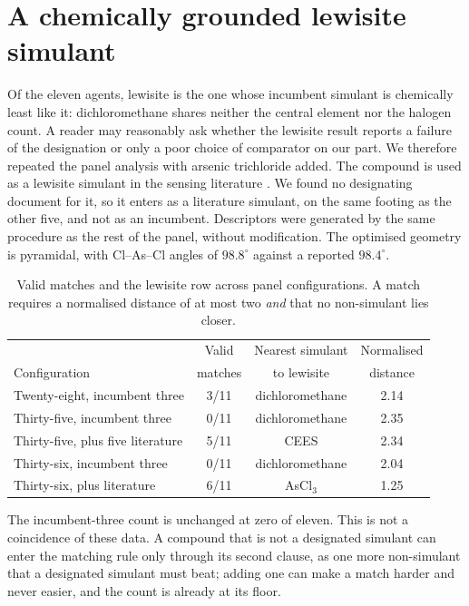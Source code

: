 \documentclass[11pt,a4paper]{article}
\begin{document}
\section{A chemically grounded lewisite simulant}
\label{sec:si-ascl3}

\begin{sloppypar}
Of the eleven agents, lewisite is the one whose incumbent simulant is
chemically least like it: dichloromethane shares neither the central element
nor the halogen count. A reader may reasonably ask whether the lewisite result
reports a failure of the designation or only a poor choice of comparator on
our part. We therefore repeated the panel analysis with arsenic trichloride
added. The compound is used as a lewisite simulant in the sensing
literature \cite{lee2016lewisite}. We found no designating document for it,
so it enters as a literature simulant, on the same footing as the other
five, and not as an incumbent. Descriptors were generated by the same procedure as the
rest of the panel, without modification. The optimised geometry is pyramidal,
with Cl--As--Cl angles of $98.8^\circ$ against a reported $98.4^\circ$.
\end{sloppypar}

\begin{table}[htbp]
\centering
\caption{Valid matches and the lewisite row across panel configurations.
A match requires a normalised distance of at most two \emph{and} that no
non-simulant lies closer.}
\label{tab:si-ascl3}
\small
\begin{tabular}{@{}lccc@{}}
\hline
 & Valid & Nearest simulant & Normalised \\
Configuration & matches & to lewisite & distance \\
\hline
Twenty-eight, incumbent three & 3/11 & dichloromethane & 2.14 \\
Thirty-five, incumbent three & 0/11 & dichloromethane & 2.35 \\
Thirty-five, plus five literature & 5/11 & CEES & 2.34 \\
Thirty-six, incumbent three & 0/11 & dichloromethane & 2.04 \\
Thirty-six, plus literature & 6/11 & AsCl$_3$ & 1.25 \\
\hline
\end{tabular}
\end{table}

The incumbent-three count is unchanged at zero of eleven. This is not a
coincidence of these data. A compound that is not a designated simulant can
enter the matching rule only through its second clause, as one more
non-simulant that a designated simulant must beat; adding one can make a match
harder and never easier, and the count is already at its floor.
\end{document}
